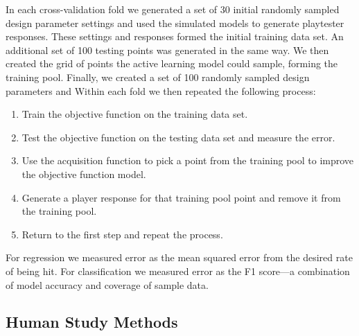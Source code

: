 \documentclass{sig-alternate}
\begin{document}
In each cross-validation fold we generated a set of 30 initial randomly sampled design parameter settings and used the simulated models to generate playtester responses.
These settings and responses formed the initial training data set.
An additional set of 100 testing points was generated in the same way.
We then created the grid of points the active learning model could sample, forming the training pool.
Finally, we created a set of 100 randomly sampled design parameters and 
Within each fold we then repeated the following process:
\begin{enumerate}
\item Train the objective function on the training data set.
\item Test the objective function on the testing data set and measure the error.
\item Use the acquisition function to pick a point from the training pool to improve the objective function model.
\item Generate a player response for that training pool point and remove it from the training pool.
\item Return to the first step and repeat the process.
\end{enumerate}
\noindent For regression we measured error as the mean squared error from the desired rate of being hit.
For classification we measured error as the F1 score---a combination of model accuracy and coverage of sample data.


%

%
% 

%

\subsection{Human Study Methods}
\end{document}
